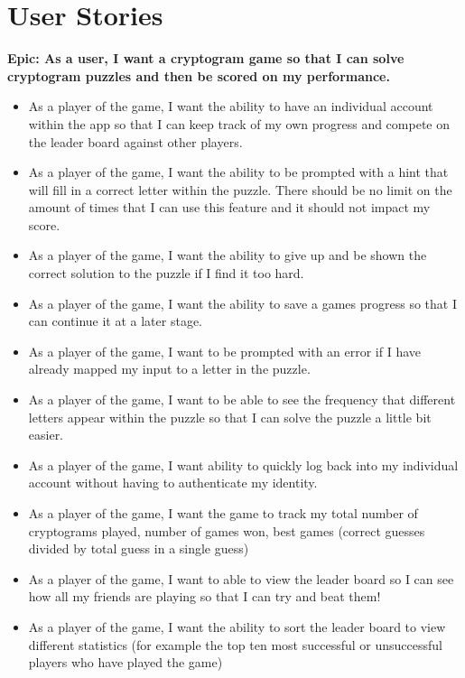 \documentclass[a4paper,12pt]{article}
\begin{document}
\section{User Stories}


\textbf{Epic: As a user, I want a cryptogram game so that I can solve cryptogram puzzles and then be scored on my performance.}


\begin{itemize}

  \item As a player of the game, I want the ability to have an individual account within the app so that I can keep track of my own progress and compete on the leader board against other players.

  \item As a player of the game, I want the ability to be prompted with a hint that will fill in a correct letter within the puzzle. There should be no limit on the amount of times that I can use this feature and it should not impact my score.

  \item As a player of the game, I want the ability to give up and be shown the correct solution to the puzzle if I find it too hard. 

  \item As a player of the game, I want the ability to save a games progress so that I can continue it at a later stage. 

  \item As a player of the game, I want to be prompted with an error if I have already mapped my input to a letter in the puzzle.

  \item As a player of the game, I want to be able to see the frequency that different letters appear within the puzzle so that I can solve the puzzle a little bit easier. 

  \item As a player of the game, I want ability to quickly log back into my individual account without having to authenticate my identity. 

  \item As a player of the game, I want the game to track my total number of cryptograms played, number of games won, best games (correct guesses divided by total guess in a single guess)

  \item As a player of the game, I want to able to view the leader board so I can see how all my friends are playing so that I can try and beat them!

  \item As a player of the game, I want the ability to sort the leader board to view different statistics (for example the top ten most successful or unsuccessful players who have played the game) 

\end{itemize}
\end{document}
